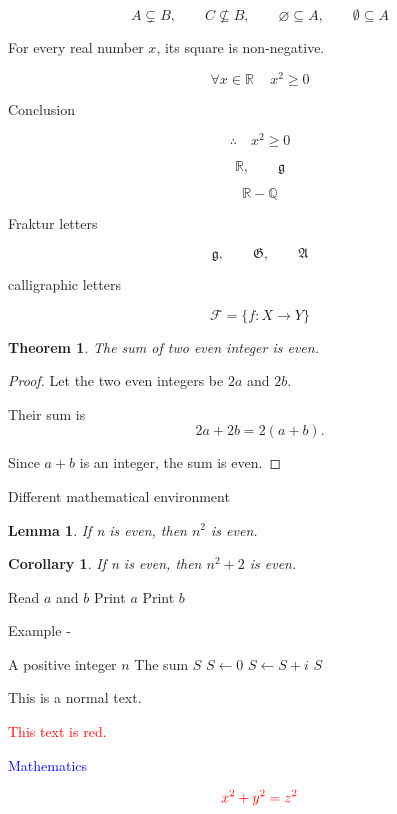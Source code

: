 \documentclass{article}
\newtheorem{theorem}{Theorem}
\newtheorem{lemma}{Lemma}
\newtheorem{corollary}{Corollary}
\begin{document}
\[
A \subsetneq B, \qquad
C \nsubseteq B, \qquad
\varnothing \subseteq A, \qquad
\emptyset \subseteq A
\]

For every real number \(x\), its square is non-negative.

\[
\forall x \in \mathbb{R} \, \quad x^2 \ge 0
\]

Conclusion

\[
\therefore \quad x^2 \geq 0
\]

\pagebreak

\[
\mathbb{R}, \qquad \mathfrak{g}
\]

$$ \mathbb{R} - \mathbb{Q}  $$

Fraktur letters

\[
\mathfrak{g}, \qquad
\mathfrak{G}, \qquad
\mathfrak{A}
\]

calligraphic letters

\[
\mathcal{F} = \{f : X \to Y\}
\]

\pagebreak

\begin{theorem}
    The sum of two even integer is even.
\end{theorem}


\begin{proof}
Let the two even integers be $2a$ and $2b$.

Their sum is
\[
2a+2b=2(a+b).
\]

Since $a+b$ is an integer, the sum is even.
\end{proof}

Different mathematical environment

\begin{lemma}
    If n is even, then $n^2$ is even.
\end{lemma}

\begin{corollary}
    If n is even, then $n^2+2$ is even.
\end{corollary}

\pagebreak

\begin{algorithm}
\caption{Find the Larger Number}
\begin{algorithmic}[1]
    \State Read $a$ and $b$
        \State Print $a$
    \Else
        \State Print $b$
    \EndIf
\end{algorithmic}
\end{algorithm}

Example -

\begin{algorithm}
\caption{Sum of First $n$ Natural Numbers}
\begin{algorithmic}[1]
    \Require A positive integer $n$
    \Ensure The sum $S$
    \State $S \gets 0$
        \State $S \gets S+i$
    \EndFor
    \Return $S$
\end{algorithmic}
\end{algorithm}

\pagebreak

This is a normal text.

\textcolor{red}{This text is red.}

\textcolor{blue}{Mathematics}

\[
\textcolor{red}{x^2+y^2=z^2}
\]
\end{document}
